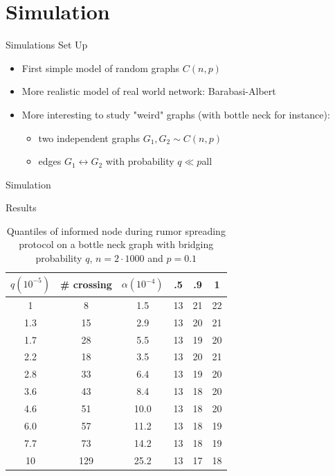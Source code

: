 \documentclass{beamer}
\begin{document}
\section{Simulation}

\frame{\sectionpage}

\begin{frame}{Simulations Set Up}
\begin{itemize}
  \item 
    First simple model of random graphs $C(n,p)$

  \item
    More realistic model of real world network: Barabasi-Albert
  \item More interesting to study "weird" graphs (with bottle neck for instance): 
  \begin{itemize}
    \item two independent graphs $G_1, G_2 \sim C(n,p)$
    \item edges $G_1 \leftrightarrow G_2$ with probability $q \ll p$all
  \end{itemize}
\end{itemize}

\end{frame}

\begin{frame}{Simulation}
  
\end{frame}

\begin{frame}{Results}
  \begin{table}
\centering
\begin{tabular}{c|c|c||c|c|c}
  $q (10^{-5})$ & \# crossing & $\alpha (10^{-4})$ & .5 & .9 & 1\\
  \hline
  1 & 8 & 1.5 & 13 & 21 & 22 \\
1.3 & 15 & 2.9 & 13 & 20 & 21 \\
1.7 & 28 & 5.5 & 13 & 19 & 20 \\
2.2 & 18 & 3.5 & 13 & 20 & 21 \\
2.8 & 33 & 6.4 & 13 & 19 & 20 \\
3.6 & 43 & 8.4 & 13 & 18 & 20 \\
4.6 & 51 & 10.0 & 13 & 18 & 20 \\
6.0 & 57 & 11.2 & 13 & 18 & 19 \\
7.7 & 73 & 14.2 & 13 & 18 & 19 \\
10 & 129 & 25.2 & 13 & 17 & 18 \\
\end{tabular}
\caption{Quantiles of informed node during rumor spreading protocol on a bottle neck graph with bridging probability $q$, $n = 2 \cdot 1000$ and $p = 0.1$}
\label{tab:quantiles}
\end{table}
\end{frame}
\end{document}
